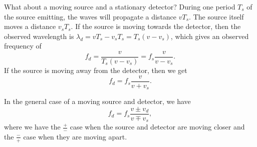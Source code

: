 \documentclass[../classical_mechanics.tex]{subfiles}
\begin{document}
        What about a moving source and a stationary detector?
        During one period $T_s$ of the source emitting, the waves will propagate a distance $vT_s$.
        The source itself moves a distance $v_sT_s$.
        If the source is moving towards the detector, then the observed wavelength is $\lambda_d=vT_s-v_sT_s=T_s(v-v_s)$, which gives an observed frequency of
        \begin{equation}
            f_d=\frac{v}{T_s(v-v_s)}=f_s\frac{v}{v-v_s}.
        \end{equation}
        If the source is moving away from the detector, then we get
        \begin{equation}
            f_d=f_s\frac{v}{v+v_s}.
        \end{equation}

        In the general case of a moving source and detector, we have
        \begin{equation}
            f_d=f_s\frac{v\pm v_d}{v\mp v_s},
        \end{equation}
        where we have the $\frac{+}{-}$ case when the source and detector are moving closer and the $\frac{-}{+}$ case when they are moving apart.
\end{document}
